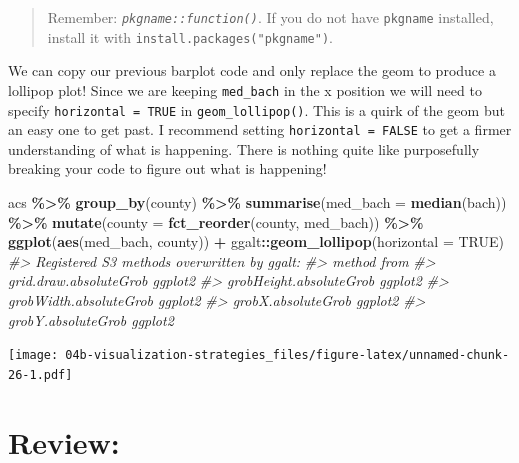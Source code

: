 \documentclass[
]{book}
\newenvironment{Shaded}{\begin{snugshade}}{\end{snugshade}}
\newcommand{\CommentTok}[1]{\textcolor[rgb]{0.56,0.35,0.01}{\textit{#1}}}
\newcommand{\DataTypeTok}[1]{\textcolor[rgb]{0.13,0.29,0.53}{#1}}
\newcommand{\KeywordTok}[1]{\textcolor[rgb]{0.13,0.29,0.53}{\textbf{#1}}}
\newcommand{\NormalTok}[1]{#1}
\newcommand{\OperatorTok}[1]{\textcolor[rgb]{0.81,0.36,0.00}{\textbf{#1}}}
\newcommand{\OtherTok}[1]{\textcolor[rgb]{0.56,0.35,0.01}{#1}}
\newcommand{\StringTok}[1]{\textcolor[rgb]{0.31,0.60,0.02}{#1}}
\begin{document}
\begin{quote}
Remember: \emph{\texttt{pkgname::function()}}. If you do not have \texttt{pkgname} installed, install it with \texttt{install.packages("pkgname")}.
\end{quote}

We can copy our previous barplot code and only replace the geom to produce a lollipop plot! Since we are keeping \texttt{med\_bach} in the x position we will need to specify \texttt{horizontal\ =\ TRUE} in \texttt{geom\_lollipop()}. This is a quirk of the geom but an easy one to get past. I recommend setting \texttt{horizontal\ =\ FALSE} to get a firmer understanding of what is happening. There is nothing quite like purposefully breaking your code to figure out what is happening!

\begin{Shaded}
\begin{Highlighting}[]
\NormalTok{acs }\OperatorTok{\%\textgreater{}\%}\StringTok{ }
\StringTok{  }\KeywordTok{group\_by}\NormalTok{(county) }\OperatorTok{\%\textgreater{}\%}\StringTok{ }
\StringTok{  }\KeywordTok{summarise}\NormalTok{(}\DataTypeTok{med\_bach =} \KeywordTok{median}\NormalTok{(bach)) }\OperatorTok{\%\textgreater{}\%}\StringTok{ }
\StringTok{  }\KeywordTok{mutate}\NormalTok{(}\DataTypeTok{county =} \KeywordTok{fct\_reorder}\NormalTok{(county, med\_bach)) }\OperatorTok{\%\textgreater{}\%}\StringTok{ }
\StringTok{  }\KeywordTok{ggplot}\NormalTok{(}\KeywordTok{aes}\NormalTok{(med\_bach, county)) }\OperatorTok{+}\StringTok{ }
\StringTok{  }\NormalTok{ggalt}\OperatorTok{::}\KeywordTok{geom\_lollipop}\NormalTok{(}\DataTypeTok{horizontal =} \OtherTok{TRUE}\NormalTok{)}
\CommentTok{\#\textgreater{} Registered S3 methods overwritten by \textquotesingle{}ggalt\textquotesingle{}:}
\CommentTok{\#\textgreater{}   method                  from   }
\CommentTok{\#\textgreater{}   grid.draw.absoluteGrob  ggplot2}
\CommentTok{\#\textgreater{}   grobHeight.absoluteGrob ggplot2}
\CommentTok{\#\textgreater{}   grobWidth.absoluteGrob  ggplot2}
\CommentTok{\#\textgreater{}   grobX.absoluteGrob      ggplot2}
\CommentTok{\#\textgreater{}   grobY.absoluteGrob      ggplot2}
\end{Highlighting}
\end{Shaded}

\texttt{[image: 04b-visualization-strategies\_files/figure-latex/unnamed-chunk-26-1.pdf]}

\hypertarget{review}{%
\section{Review:}\label{review}}
\end{document}

